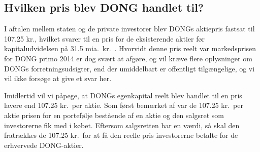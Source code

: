 \documentclass{article}
\begin{document}
\subsection{Hvilken pris blev DONG handlet til?}

I aftalen mellem staten og de private investorer blev  DONGs aktiepris fastsat til 107.25 kr., hvilket svarer til en pris for de eksisterende aktier før kapitaludvidelsen på 31.5 mia.\ kr.\ \citep{FM2013a}. Hvorvidt denne pris reelt var markedsprisen for DONG primo 2014 er dog svært at afgøre, og vil kræve flere oplysninger om DONGs forretningsudsigter, end der umiddelbart er offentligt tilgængelige, og vi vil ikke forsøge at give et svar her. 

Imidlertid vil vi påpege, at DONGs egenkapital reelt blev handlet til en pris lavere end 107.25 kr.\ per aktie. Som først bemærket af \cite{Moeller2014} var de 107.25 kr.\ per aktie prisen for en portefølje bestående af en aktie og den salgsret som investorerne fik med i købet. Eftersom salgsretten har en værdi, så skal den fratrækkes de 107.25 kr.\ for at få den reelle pris investorerne betalte for de erhvervede DONG-aktier.
\end{document}
